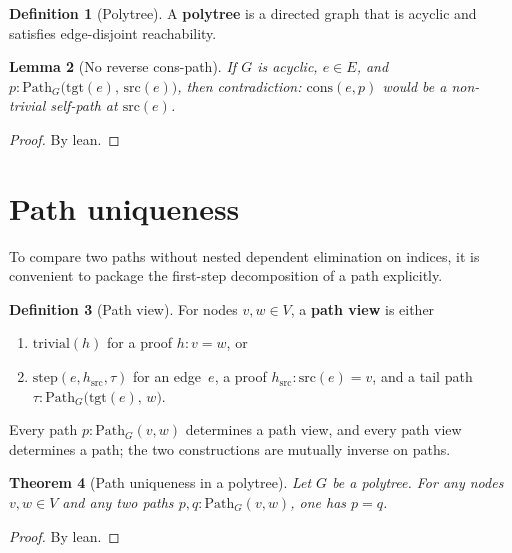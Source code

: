 \documentclass[11pt,a4paper]{article}
\theoremstyle{plain}
\newtheorem{theorem}{Theorem}[section]
\newtheorem{lemma}[theorem]{Lemma}
\theoremstyle{definition}
\newtheorem{definition}[theorem]{Definition}
\newcommand{\src}{\mathrm{src}}
\newcommand{\tgt}{\mathrm{tgt}}
\begin{document}
\begin{definition}[Polytree]\label{def:polytree}
A \textbf{polytree} is a directed graph that is acyclic and satisfies
edge-disjoint reachability.
\end{definition}

\begin{lemma}[No reverse cons-path]\label{lem:no-cons}
If $G$ is acyclic, $e \in E$, and $p : \mathrm{Path}_G\bigl(\tgt(e),\,
\src(e)\bigr)$, then contradiction: $\mathrm{cons}(e,p)$ would be a non-trivial
self-path at $\src(e)$.
\end{lemma}

\begin{proof}
By lean.
\end{proof}

\section{Path uniqueness}

To compare two paths without nested dependent elimination on indices, it is
convenient to package the first-step decomposition of a path explicitly.

\begin{definition}[Path view]\label{def:path-view}
For nodes $v,w \in V$, a \textbf{path view} is either
\begin{enumerate}
  \item $\mathrm{trivial}(h)$ for a proof $h : v = w$, or
  \item $\mathrm{step}(e,h_{\mathrm{src}},\tau)$ for an edge~$e$, a proof
        $h_{\mathrm{src}} : \src(e) = v$, and a tail path
        $\tau : \mathrm{Path}_G\bigl(\tgt(e),\, w\bigr)$.
\end{enumerate}
Every path $p : \mathrm{Path}_G(v,w)$ determines a path view, and every path
view determines a path; the two constructions are mutually inverse on paths.
\end{definition}

\begin{theorem}[Path uniqueness in a polytree]\label{thm:path-unique}
Let $G$ be a polytree. For any nodes $v,w \in V$ and any two paths
$p,q : \mathrm{Path}_G(v,w)$, one has $p = q$.
\end{theorem}

\begin{proof}
By lean.
\end{proof}
\end{document}
